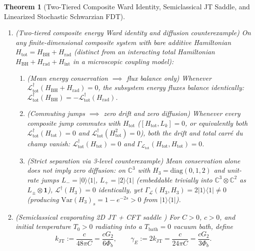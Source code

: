 \documentclass[11pt,a4paper]{article}
\newtheorem{theorem}{Theorem}
\theoremstyle{definition}
\theoremstyle{remark}
\newcommand{\cL}{\mathcal{L}}
\newcommand{\bbC}{\mathbb{C}}
\newcommand{\1}{\mathbf{1}}
\begin{document}
\begin{theorem}[Two-Tiered Composite Ward Identity, Semiclassical JT Saddle, and Linearized Stochastic Schwarzian FDT]\label{thm:jt-sk}
\leavevmode
\begin{enumerate}
  \item[(a)] \emph{(Two-tiered composite energy Ward identity and diffusion counterexample)} On any finite-dimensional composite system with bare additive Hamiltonian $H_{\mathrm{tot}} = H_{\mathrm{BH}} + H_{\mathrm{rad}}$ (distinct from an interacting total Hamiltonian $H_{\mathrm{BH}}+H_{\mathrm{rad}}+H_{\mathrm{int}}$ in a microscopic coupling model):
  \begin{enumerate}
    \item[(i)] \emph{(Mean energy conservation $\implies$ flux balance only)} Whenever $\cL_{\mathrm{tot}}^\dagger(H_{\mathrm{BH}}+H_{\mathrm{rad}}) = 0$, the subsystem energy fluxes balance identically: $\cL_{\mathrm{tot}}^\dagger(H_{\mathrm{BH}}) = -\cL_{\mathrm{tot}}^\dagger(H_{\mathrm{rad}})$.
    \item[(ii)] \emph{(Commuting jumps $\implies$ zero drift and zero diffusion)} Whenever every composite jump commutes with $H_{\mathrm{tot}}$ ($[H_{\mathrm{tot}}, L_k] = 0$, or equivalently both $\cL_{\mathrm{tot}}^\dagger(H_{\mathrm{tot}})=0$ and $\cL_{\mathrm{tot}}^\dagger(H_{\mathrm{tot}}^2)=0$), both the drift and total carr\'e du champ vanish: $\cL_{\mathrm{tot}}^\dagger(H_{\mathrm{tot}})=0$ and $\Gamma_{\cL_{\mathrm{tot}}}(H_{\mathrm{tot}}, H_{\mathrm{tot}}) = 0$.
    \item[(iii)] \emph{(Strict separation via 3-level counterexample)} Mean conservation alone does \emph{not} imply zero diffusion: on $\bbC^3$ with $H_3 = \mathrm{diag}(0,1,2)$ and unit-rate jumps $L_- = |0\rangle\langle 1|$, $L_+ = |2\rangle\langle 1|$ (embeddable trivially into $\bbC^3\otimes\bbC^2$ as $L_\pm\otimes\1$), $\cL^\dagger(H_3) = 0$ identically, yet $\Gamma_\cL(H_3,H_3) = 2|1\rangle\langle 1| \neq 0$ (producing $\mathrm{Var}(H_3)_s = 1 - e^{-2s} > 0$ from $|1\rangle\langle 1|$).
  \end{enumerate}
  \item[(b)] \emph{(Semiclassical evaporating 2D JT + CFT saddle \cite{Mertens2019})} For $C > 0$, $c > 0$, and initial temperature $T_0 > 0$ radiating into a $T_{\mathrm{bath}}=0$ vacuum bath, define
  \begin{equation}\label{eq:jt-rates}
    k_{\mathrm{JT}} := \frac{c}{48\pi C} = \frac{c G_2}{6\Phi_b}, \qquad
    \gamma_E := 2 k_{\mathrm{JT}} = \frac{c}{24\pi C} = \frac{c G_2}{3\Phi_b}.

\end{equation}
\end{enumerate}
\end{theorem}
\end{document}
